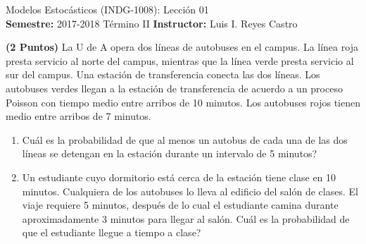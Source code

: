 \documentclass[ a4paper, twoside, 11pt]{article}
\newcommand{\numero}{01}
\begin{document}
\allowdisplaybreaks



\begin{center}
\Large Modelos Estoc\'asticos (INDG-1008): Lecci\'on \numero \\[2ex]
\small \textbf{Semestre:} 2017-2018 T\'ermino II \qquad
\textbf{Instructor:} Luis I. Reyes Castro
\end{center}
\fullskip

\begin{problem}
\textbf{(2 Puntos)} La U de A opera dos l\'ineas de autobuses en el campus. \linebreak La l\'inea roja presta servicio al norte del campus, mientras que la l\'inea verde presta servicio \linebreak al sur del campus. Una estaci\'on de transferencia conecta las dos l\'ineas. Los autobuses verdes llegan a la estaci\'on de transferencia de acuerdo a un proceso Poisson con tiempo medio entre arribos de 10 minutos. Los autobuses rojos tienen medio entre arribos de 7 minutos. 
\begin{enumerate}[label=\alph*)]
\item Cu\'al es la probabilidad de que al menos un autobus de cada una de las dos l\'ineas se detengan en la estaci\'on durante un intervalo de 5 minutos?
\item Un estudiante cuyo dormitorio est\'a cerca de la estaci\'on tiene clase en 10 minutos. Cualquiera de los autobuses lo lleva al edificio del sal\'on de clases. El viaje requiere 5 minutos, despu\'es de lo cual el estudiante camina durante aproximadamente 3 minutos para llegar al sal\'on. Cu\'al es la probabilidad de que el estudiante llegue a tiempo a clase?
\end{enumerate}

\end{problem}
\vspace{\baselineskip}
\end{document}
